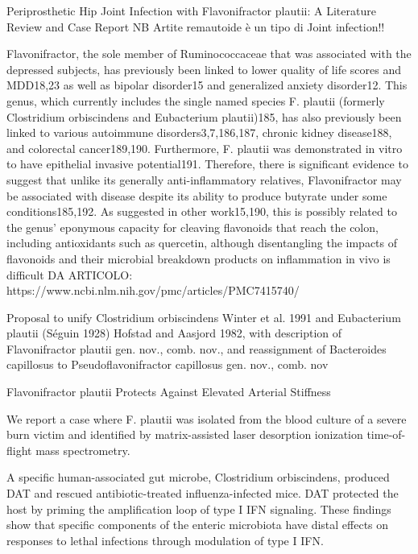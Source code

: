 \documentclass[a4paper,titlepage]{book}
\begin{document}
Periprosthetic Hip Joint Infection with Flavonifractor plautii: A Literature Review and Case Report 
NB Artite remautoide è un tipo di Joint infection!!

Flavonifractor, the sole member of Ruminococcaceae that was associated with the depressed subjects, has previously been linked to lower quality of life scores and MDD18,23 as well as bipolar disorder15 and generalized anxiety disorder12. This genus, which currently includes the single named species F. plautii (formerly Clostridium orbiscindens and Eubacterium plautii)185, has also previously been linked to various autoimmune disorders3,7,186,187, chronic kidney disease188, and colorectal cancer189,190. Furthermore, F. plautii was demonstrated in vitro to have epithelial invasive potential191. Therefore, there is significant evidence to suggest that unlike its generally anti-inflammatory relatives, Flavonifractor may be associated with disease despite its ability to produce butyrate under some conditions185,192. As suggested in other work15,190, this is possibly related to the genus’ eponymous capacity for cleaving flavonoids that reach the colon, including antioxidants such as quercetin, although disentangling the impacts of flavonoids and their microbial breakdown products on inflammation in vivo is difficult 
DA ARTICOLO: https://www.ncbi.nlm.nih.gov/pmc/articles/PMC7415740/


Proposal to unify Clostridium orbiscindens Winter et al. 1991 and Eubacterium plautii (Séguin 1928) Hofstad and Aasjord 1982, with description of Flavonifractor plautii gen. nov., comb. nov., and reassignment of Bacteroides capillosus to Pseudoflavonifractor capillosus gen. nov., comb. nov

Flavonifractor plautii Protects Against Elevated Arterial Stiffness

We report a case where F. plautii was isolated from the blood culture of a severe burn victim and identified by matrix-assisted laser desorption ionization time-of-flight mass spectrometry.

A specific human-associated gut microbe, Clostridium orbiscindens, produced DAT and rescued antibiotic-treated influenza-infected mice. DAT protected the host by priming the amplification loop of type I IFN signaling. These findings show that specific components of the enteric microbiota have distal effects on responses to lethal infections through modulation of type I IFN.
\end{document}
